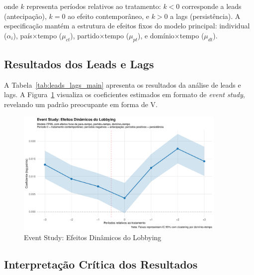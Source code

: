 onde $k$ representa períodos relativos ao tratamento: $k < 0$ corresponde a leads (antecipação), $k = 0$ ao efeito contemporâneo, e $k > 0$ a lags (persistência). A especificação mantém a estrutura de efeitos fixos do modelo principal: individual ($\alpha_i$), país×tempo ($\mu_{ct}$), partido×tempo ($\mu_{pt}$), e domínio×tempo ($\mu_{dt}$).

\subsection{Resultados dos Leads e Lags}

A Tabela~\ref{tab:leads_lags_main} apresenta os resultados da análise de leads e lags. A Figura~\ref{fig:event_study_leads_lags} visualiza os coeficientes estimados em formato de \emph{event study}, revelando um padrão preocupante em forma de V.



\begin{figure}[htbp]
    \centering
    \includegraphics[width=0.9\textwidth]{figures/leads_lags/event_study_leads_lags.pdf}
    \caption{Event Study: Efeitos Dinâmicos do Lobbying}
    \label{fig:event_study_leads_lags}
\end{figure}

\subsection{Interpretação Crítica dos Resultados}

